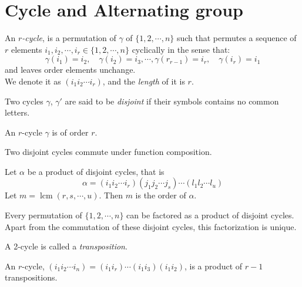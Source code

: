 \newpage

\section{Cycle and Alternating group} \label{sec:}

\begin{definition}[$r$-cycle]
An \textit{$r$-cycle}, is a permutation of $\gamma$ of $\{1,2,\cdots ,n \}$ such that permutes a sequence of $r$ elements $i_1, i_2, \cdots  , i_r \in \{1,2,\cdots ,n \}$ cyclically in the sense that:
$$
    \gamma(i_1) = i_2, \quad \gamma(i_2) = i_3,\cdots ,\gamma(r_{r-1})=i_r, \quad  \gamma(i_r) = i_1
$$
and leaves order elements unchange.
\\ We denote it as $(i_1i_2\cdots i_r)$, and the \textit{length} of it is $r$.
\end{definition}

\begin{definition}[Disjoint]
Two cycles $\gamma$, $\gamma'$ are said to be \textit{disjoint} if their symbols contains no common letters.
\end{definition}

\begin{prop}
An $r$-cycle $\gamma$ is of order $r$.
\end{prop}

\begin{prop}
Two disjoint cycles commute under function composition.
\end{prop}

\begin{prop}
Let $\alpha$ be a product of disjoint cycles, that is
$$
\alpha = (i_1i_2\cdots i_r)(j_1j_2\cdots j_s)\cdots (l_1l_2\cdots l_u)
$$
Let $m = \operatorname{lcm}(r,s,\cdots ,u)$. Then $m$ is the order of $\alpha$.
\end{prop}

\begin{prop}
Every permutation of $\{ 1,2,\cdots ,n \}$ can be factored as a product of disjoint cycles. Apart from the commutation of these disjoint cycles, this factorization is unique.
\end{prop}

\begin{definition}[Transposition]
A 2-cycle is called a \textit{transposition}.
\end{definition}

\begin{remark}
An $r$-cycle, $(i_1i_2\cdots i_n) = (i_1i_r)\cdots (i_1i_3)(i_1i_2)$, is a product of $r-1$ transpositions.
\end{remark}

